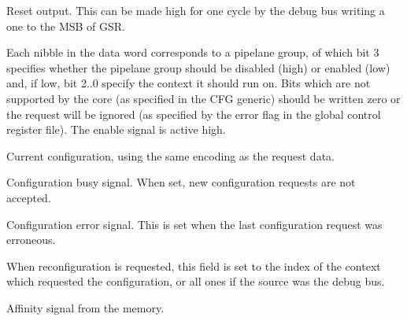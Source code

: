 
\globalInterface{}

\ifaceSubGroup{}
Reset output. This can be made high for one cycle by the debug bus writing a one
to the MSB of GSR.

\ifaceSubGroup{}
Each nibble in the data word corresponds to a pipelane group, of which bit 3 
specifies whether the pipelane group should be disabled (high) or enabled (low) 
and, if low, bit 2..0 specify the context it should run on. Bits which are not 
supported by the core (as specified in the CFG generic) should be written zero 
or the request will be ignored (as specified by the error flag in the global 
control register file). The enable signal is active high.

\ifaceSubGroup{}
Current configuration, using the same encoding as the request data.
    
\ifaceSubGroup{}
Configuration busy signal. When set, new configuration requests are not 
accepted.
    
\ifaceSubGroup{}
Configuration error signal. This is set when the last configuration request was 
erroneous.
    
\ifaceSubGroup{}
When reconfiguration is requested, this field is set to the index of the context 
which requested the configuration, or all ones if the source was the debug bus.

\ifaceSubGroup{}
Affinity signal from the memory.

